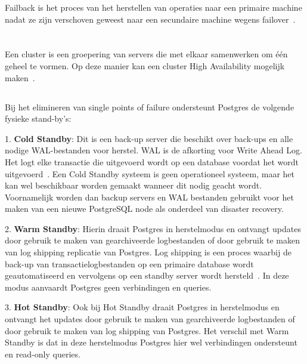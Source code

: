 Failback is het proces van het herstellen van operaties naar een primaire machine  nadat ze zijn verschoven geweest naar een secundaire machine wegens failover~\autocite{TechTarget2020}.


\section{}
\label{sec:Cluster solutions}

\subsection{}
\label{subsec:Cluster}

Een cluster is een groepering van servers die met elkaar samenwerken om één geheel te vormen. Op deze manier kan een cluster High Availability mogelijk maken~\autocite{TechTarget2017}.

\subsection{}
\label{subsec:Standby mogelijkheden}
Bij het elimineren van single points of failure ondersteunt Postgres de volgende fysieke stand-by's:

1. \textbf{Cold Standby}: Dit is een back-up server die beschikt over back-ups en alle nodige WAL-bestanden voor herstel. WAL is de afkorting voor Write Ahead Log. Het logt elke transactie die uitgevoerd wordt op een database voordat het wordt uitgevoerd~\autocite{PostgreSQL2021d}. Een Cold Standby systeem is geen operationeel systeem, maar het kan wel beschikbaar worden gemaakt wanneer dit nodig geacht wordt. Voornamelijk worden dan backup servers en WAL bestanden gebruikt voor het maken van een nieuwe PostgreSQL node als onderdeel van disaster recovery.

2. \textbf{Warm Standby}: Hierin draait Postgres in herstelmodus en ontvangt updates door gebruik te maken van gearchiveerde logbestanden of door gebruik te maken van log shipping replicatie van Postgres. Log shipping is een proces waarbij de back-up van transactielogbestanden op een primaire database wordt geautomatiseerd en vervolgens op een standby server wordt hersteld~\autocite{Miller2016}. In deze modus aanvaardt Postgres geen verbindingen en queries.

3. \textbf{Hot Standby}: Ook bij Hot Standby draait Postgres in herstelmodus en ontvangt het updates door gebruik te maken van gearchiveerde logbestanden of door gebruik te maken van log shipping van Postgres. Het verschil met Warm Standby is dat in deze herstelmodus Postgres hier wel verbindingen ondersteunt en read-only queries.

